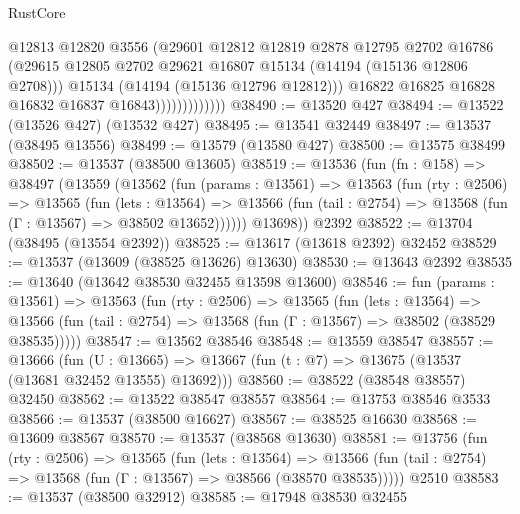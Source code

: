 \begin{lexlean}{RustCore}
\begin{coremodule}
                              @12813
                              @12820
                              @3556
                              (@29601
                                @12812
                                @12819
                                @2878
                                @12795
                                @2702
                                @16786
                                (@29615
                                  @12805
                                  @2702
                                  @29621
                                  @16807
                                  @15134
                                  (@14194 (@15136 @12806 @2708)))
                                @15134
                                (@14194 (@15136 @12796 @12812)))
                              @16822
                              @16825
                              @16828
                              @16832
                              @16837
                              @16843)))))))))))))
@38490 := @13520 @427
@38494 := @13522 (@13526 @427) (@13532 @427)
@38495 := @13541 @32449
@38497 := @13537 (@38495 @13556)
@38499 := @13579 (@13580 @427)
@38500 := @13575 @38499
@38502 := @13537 (@38500 @13605)
@38519 := @13536
    (fun (fn : @158) =>
    @38497
      (@13559
        (@13562
          (fun (params : @13561) =>
          @13563
            (fun (rty : @2506) =>
            @13565
              (fun (lets : @13564) =>
              @13566 (fun (tail : @2754) => @13568 (fun (Γ : @13567) => @38502 @13652))))))
        @13698))
    @2392
@38522 := @13704 (@38495 (@13554 @2392))
@38525 := @13617 (@13618 @2392) @32452
@38529 := @13537 (@13609 (@38525 @13626) @13630)
@38530 := @13643 @2392
@38535 := @13640 (@13642 @38530 @32455 @13598 @13600)
@38546 := fun (params : @13561) =>
  @13563
    (fun (rty : @2506) =>
    @13565
      (fun (lets : @13564) =>
      @13566 (fun (tail : @2754) => @13568 (fun (Γ : @13567) => @38502 (@38529 @38535)))))
@38547 := @13562 @38546
@38548 := @13559 @38547
@38557 := @13666
    (fun (U : @13665) => @13667 (fun (t : @7) => @13675 (@13537 (@13681 @32452 @13555) @13692)))
@38560 := @38522 (@38548 @38557) @32450
@38562 := @13522 @38547 @38557
@38564 := @13753 @38546 @3533
@38566 := @13537 (@38500 @16627)
@38567 := @38525 @16630
@38568 := @13609 @38567
@38570 := @13537 (@38568 @13630)
@38581 := @13756
    (fun (rty : @2506) =>
    @13565
      (fun (lets : @13564) =>
      @13566 (fun (tail : @2754) => @13568 (fun (Γ : @13567) => @38566 (@38570 @38535)))))
    @2510
@38583 := @13537 (@38500 @32912)
@38585 := @17948 @38530 @32455

\end{coremodule}
\end{lexlean}
